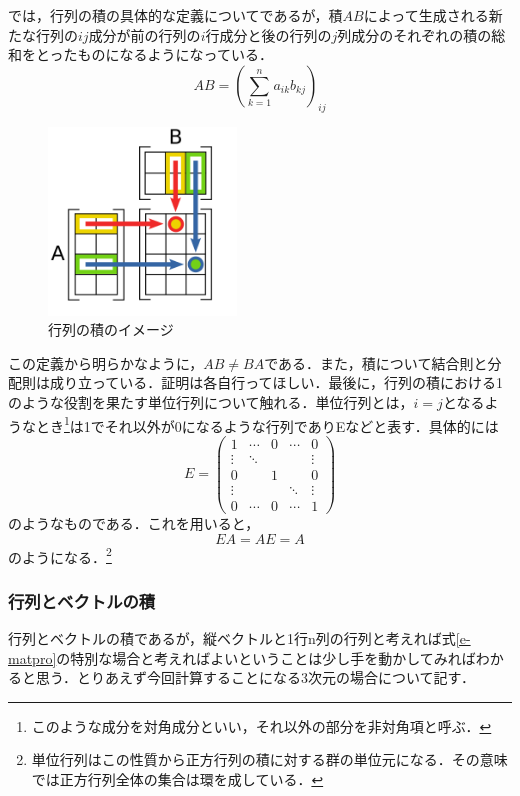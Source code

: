 \documentclass[dvipdfmx,a4]{jsarticle}
\begin{document}
では，行列の積の具体的な定義についてであるが，積\(AB\)によって生成される新たな行列の\(ij\)成分が前の行列の\(i\)行成分と後の行列の\(j\)列成分のそれぞれの積の総和をとったものになるようになっている．
\begin{equation}
  AB = \left (\sum ^n _{k=1} a_{ik}b_{kj} \right )_{ij}
  \label{e-matpro}
\end{equation}

\begin{figure}[tbh]
  \centering
  \includegraphics[height=5cm]{fig/matpro.png}
  \caption{行列の積のイメージ}
  \label{matpro}
\end{figure}
この定義から明らかなように，\(AB \neq BA\)である．また，積について結合則と分配則は成り立っている．証明は各自行ってほしい．最後に，行列の積における1のような役割を果たす単位行列について触れる．単位行列とは，\(i=j\)となるようなとき\footnote{このような成分を対角成分といい，それ以外の部分を非対角項と呼ぶ．}は1でそれ以外が0になるような行列でありEなどと表す．具体的には
\begin{equation*}
  E=
  \begin{pmatrix}
    1      & \cdots & 0 & \cdots & 0      \\
    \vdots & \ddots &   &        & \vdots \\
    0      &        & 1 &        & 0      \\
    \vdots &        &   & \ddots & \vdots \\
    0      & \cdots & 0 & \cdots & 1
  \end{pmatrix}
\end{equation*}
のようなものである．これを用いると，
\begin{equation*}
  EA= AE =A
\end{equation*}
のようになる．\footnote{単位行列はこの性質から正方行列の積に対する群の単位元になる．その意味では正方行列全体の集合は環を成している．}

\subsubsection{行列とベクトルの積}
行列とベクトルの積であるが，縦ベクトルと1行n列の行列と考えれば式\ref{e-matpro}の特別な場合と考えればよいということは少し手を動かしてみればわかると思う．とりあえず今回計算することになる3次元の場合について記す．
\end{document}
